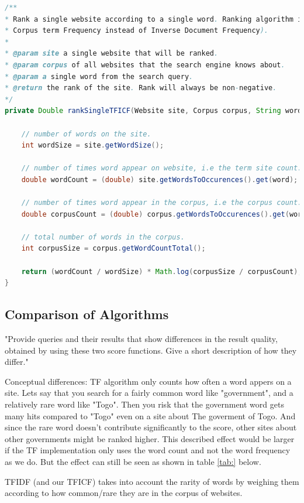 \begin{lstlisting}[language=Java, caption=This is a code example., label=lst:TFICF]
  /**
* Rank a single website according to a single word. Ranking algorithm is TFICF (i.e Inverse
* Corpus term Frequency instead of Inverse Document Frequency).
* 
* @param site a single website that will be ranked.
* @param corpus of all websites that the search engine knows about.
* @param a single word from the search query.
* @return the rank of the site. Rank will always be non-negative.
*/
private Double rankSingleTFICF(Website site, Corpus corpus, String word) {

	// number of words on the site.
	int wordSize = site.getWordSize();
	
	// number of times word appear on website, i.e the term site count.
	double wordCount = (double) site.getWordsToOccurences().get(word);
	
	// number of times word appear in the corpus, i.e the corpus count.
	double corpusCount = (double) corpus.getWordsToOccurences().get(word);
	
	// total number of words in the corpus.
	int corpusSize = corpus.getWordCountTotal();
	
	return (wordCount / wordSize) * Math.log(corpusSize / corpusCount);
}
\end{lstlisting}




\subsection{Comparison of Algorithms}
"Provide queries and their results that show differences in the result quality, obtained
by using these two score functions. Give a short description of how they differ."


Conceptual differences:
TF algorithm only counts how often a word appers on a site. Lets say that you search for a fairly common word like "government", and a relatively rare word like "Togo". Then you risk that the government word gets many hits compared to "Togo" even on a site about The goverment of Togo. And since the rare word doesn't contribute significantly to the score, other sites about other governments might be ranked higher. 
This described effect would be larger if the TF implementation only uses the word count and not the word frequency as we do. But the effect can still be seen as shown in table \ref{tab:} below. 

TFIDF (and our TFICF) takes into account the rarity of words by weighing them according to how common/rare they are in the corpus of websites. 

